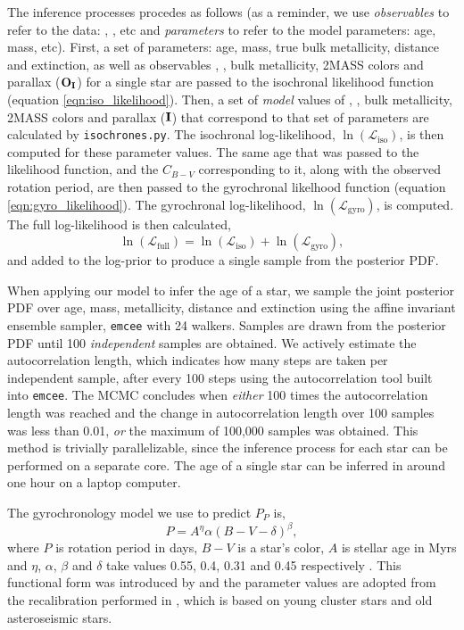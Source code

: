 The inference processes procedes as follows (as a reminder, we use {\it
observables} to refer to the data: \teff, \logg, etc and {\it parameters} to
refer to the model parameters: age, mass, etc).
First, a set of parameters: age, mass, true bulk metallicity, distance and
extinction, as well as observables \teff, \logg, bulk metallicity,
2MASS colors and parallax (${\bf O_I}$) for a single star are passed to the
isochronal likelihood function (equation \ref{eqn:iso_likelihood}).
Then, a set of {\it model} values of \teff, \logg, bulk metallicity, 2MASS
colors and parallax (${\bf I}$) that correspond to that set of parameters are
calculated by {\tt isochrones.py}.
The isochronal log-likelihood, $\ln(\mathcal{L}_{\mathrm{iso}})$, is then
computed for these parameter values.
The same age that was passed to the likelihood function, and the $C_{B-V}$
corresponding to it, along with the observed rotation period, are then passed
to the gyrochronal likelhood function (equation \ref{eqn:gyro_likelihood}).
The gyrochronal log-likelihood, $\ln(\mathcal{L}_{\mathrm{gyro}})$, is
computed.
The full log-likelihood is then calculated,
\begin{equation}
\ln(\mathcal{L}_{\mathrm{full}})
= \ln(\mathcal{L}_{\mathrm{iso}}) + \ln(\mathcal{L}_{\mathrm{gyro}}),
\label{eqn:both_likelihood}
\end{equation}
and added to the log-prior to produce a single sample from the posterior PDF.

When applying our model to infer the age of a star, we sample the joint
posterior PDF over age, mass, metallicity, distance and extinction using the
affine invariant ensemble sampler, {\tt emcee} \citep{foreman-mackey2013} with
24 walkers.
Samples are drawn from the posterior PDF until 100 {\it independent} samples
are obtained.
We actively estimate the autocorrelation length, which indicates how many
steps are taken per independent sample, after every 100 steps using the
autocorrelation tool built into {\tt emcee}.
The MCMC concludes when {\it either} 100 times the autocorrelation length was
reached and the change in autocorrelation length over 100 samples was less
than 0.01, {\it or} the maximum of 100,000 samples was obtained.
This method is trivially parallelizable, since the inference process for each
star can be performed on a separate core.
The age of a single star can be inferred in around one hour on a laptop
computer.

The gyrochronology model we use to predict $P_P$ is, %
\begin{equation}
    P = A^\eta \alpha (B-V - \delta)^\beta,
\label{eqn:gyro}
\end{equation}
where $P$ is rotation period in days, $B-V$ is a star's color, $A$ is stellar
age in Myrs and $\eta$, $\alpha$, $\beta$ and $\delta$ take values 0.55, 0.4,
0.31 and 0.45 respectively \citep{angus2015}.
This functional form was introduced by \citep{barnes2007} and the parameter
values are adopted from the recalibration performed in \citet{angus2015},
which is based on young cluster stars and old asteroseismic stars.

